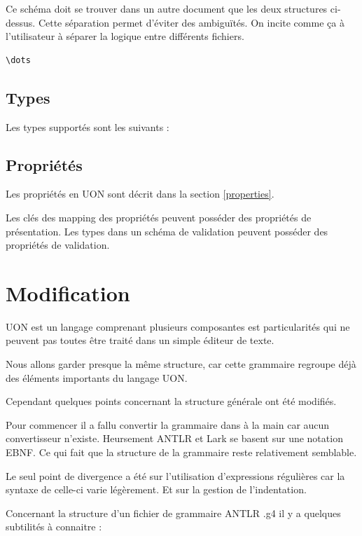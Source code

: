\documentclass[
    iict, %
    il, %
]{heig-tb}
\begin{document}
Ce schéma doit se trouver dans un autre document que les deux structures ci-dessus.
Cette séparation permet d'éviter des ambiguïtés. On incite comme ça à l'utilisateur à séparer la logique entre différents fichiers.

\begin{lstlisting}[frame=single,caption={Exemple d'un schéma de validation},captionpos=b,label={yaml-seq}]
    \dots
\end{lstlisting}

\subsection{Types}
Les types supportés sont les suivants :

\subsection{Propriétés}

Les propriétés en UON sont décrit dans la section \ref{properties}.

Les clés des mapping des propriétés peuvent posséder des propriétés de présentation.
Les types dans un schéma de validation peuvent posséder des propriétés de validation.

\section{Modification}\label{modification}

UON est un langage comprenant plusieurs composantes est particularités qui ne peuvent pas toutes être traité dans un simple éditeur de texte.

Nous allons garder presque la même structure, car cette grammaire regroupe déjà des éléments importants du langage UON.

Cependant quelques points concernant la structure générale ont été modifiés.

Pour commencer il a fallu convertir la grammaire dans à la main car aucun convertisseur n'existe. Heursement ANTLR et Lark se basent sur une notation EBNF.
Ce qui fait que la structure de la grammaire reste relativement semblable.

Le seul point de divergence a été sur l'utilisation d'expressions régulières car la syntaxe de celle-ci varie légèrement. Et sur la gestion de l'indentation.

Concernant la structure d'un fichier de grammaire ANTLR .g4 il y a quelques subtilités à connaitre :
\end{document}

